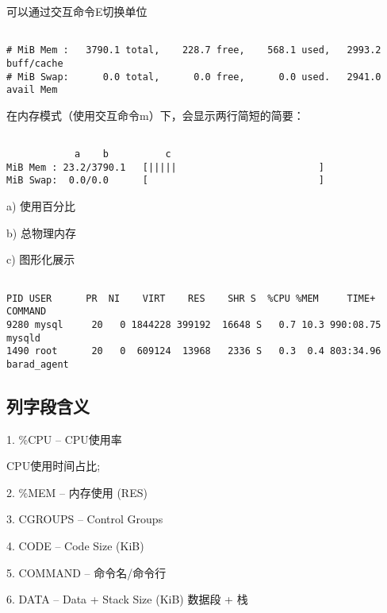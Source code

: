 可以通过交互命令E切换单位

\begin{lstlisting}[language=cshell]

# MiB Mem :   3790.1 total,    228.7 free,    568.1 used,   2993.2 buff/cache
# MiB Swap:      0.0 total,      0.0 free,      0.0 used.   2941.0 avail Mem

\end{lstlisting}

在内存模式（使用交互命令m）下，会显示两行简短的简要：

\begin{lstlisting}[language=cshell]

            a    b          c
MiB Mem : 23.2/3790.1   [|||||                         ]
MiB Swap:  0.0/0.0      [                              ]

\end{lstlisting}

a) 使用百分比

b) 总物理内存

c) 图形化展示


\begin{lstlisting}[language=cshell]

PID USER      PR  NI    VIRT    RES    SHR S  %CPU %MEM     TIME+ COMMAND
9280 mysql     20   0 1844228 399192  16648 S   0.7 10.3 990:08.75 mysqld
1490 root      20   0  609124  13968   2336 S   0.3  0.4 803:34.96 barad_agent

\end{lstlisting}

\subsection{列字段含义}

1. \%CPU  -- CPU使用率  \par
\qquad CPU使用时间占比;

2. \%MEM  --  内存使用 (RES)   \par
{}

3. CGROUPS  --  Control Groups  \par

4. CODE  --  Code Size (KiB) \par
{}

5. COMMAND  --  命令名/命令行   \par

6. DATA  --  Data + Stack Size (KiB) 数据段 + 栈    \par
{}

